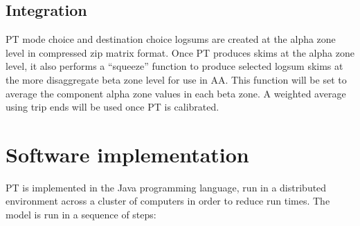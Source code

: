\subsection{Integration}
PT mode choice and destination choice logsums are created at the alpha zone level in compressed zip matrix format. Once PT produces skims at the alpha zone level, it also performs a ``squeeze'' function to produce selected logsum skims at the more disaggregate beta zone level for use in AA. This function will be set to average the component alpha zone values in each beta zone. A weighted average using trip ends will be used once PT is calibrated.

\section{Software implementation}
PT is implemented in the Java programming language, run in a distributed environment across a cluster of computers in order to reduce run times. The model is run in a sequence of steps:

